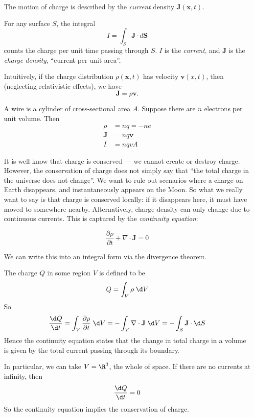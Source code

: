 \documentclass[a4paper]{article}
\begin{document}
The motion of charge is described by the \emph{current} density $\mathbf{J}(\mathbf{x}, t)$.
\begin{defi}
For any surface $S$, the integral
\[
  I = \int_S \mathbf{J}\cdot d\mathbf{S}
\]
counts the charge per unit time passing through $S$. $I$ is the \emph{current}, and $\mathbf{J}$ is the \emph{charge density}, ``current per unit area''.
\end{defi}
Intuitively, if the charge distribution $\rho (\mathbf{x}, t)$ has velocity $\mathbf{v}(x, t)$, then (neglecting relativistic effects), we have
\[
  \mathbf{J} = \rho \mathbf{v}.
\]

\begin{eg}
  A wire is a cylinder of cross-sectional area $A$. Suppose there are $n$ electrons per unit volume. Then
  \begin{align*}
    \rho &= nq = -ne\\
    \mathbf{J} &= nq\mathbf{v}\\
    I &= nqvA
  \end{align*}
\end{eg}

It is well know that charge is conserved --- we cannot create or destroy charge. However, the conservation of charge does not simply say that ``the total charge in the universe does not change''. We want to rule out scenarios where a charge on Earth disappears, and instantaneously appears on the Moon. So what we really want to say is that charge is conserved locally: if it disappears here, it must have moved to somewhere nearby. Alternatively, charge density can only change due to continuous currents. This is captured by the \emph{continuity equation}:
\begin{law}
  \[
    \frac{\partial\rho}{\partial t} + \nabla\cdot \mathbf{J} = 0
  \]
\end{law}
We can write this into an integral form via the divergence theorem.

The charge $Q$ in some region $V$ is defined to be
\[
  Q = \int_V \rho \;\d V
\]
So
\[
  \frac{\d Q}{\d t} = \int_V \frac{\partial\rho}{\partial t}\; \d V = -\int_V \nabla\cdot \mathbf{J}\; \d V = -\int_S \mathbf{J}\cdot \d S
\]
Hence the continuity equation states that the change in total charge in a volume is given by the total current passing through its boundary.

In particular, we can take $V = \R^3$, the whole of space. If there are no currents at infinity, then
\[
  \frac{\d Q}{\d t} = 0
\]
So the continuity equation implies the conservation of charge.
\end{document}
